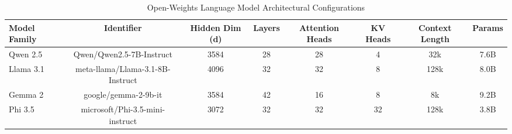 \begin{table}
\caption{Open-Weights Language Model Architectural Configurations}
\label{tab:models}
\begin{tabular}{lccccccc}
\toprule
Model Family & Identifier & Hidden Dim (d) & Layers & Attention Heads & KV Heads & Context Length & Params \\
\midrule
Qwen 2.5 & Qwen/Qwen2.5-7B-Instruct & 3584 & 28 & 28 & 4 & 32k & 7.6B \\
Llama 3.1 & meta-llama/Llama-3.1-8B-Instruct & 4096 & 32 & 32 & 8 & 128k & 8.0B \\
Gemma 2 & google/gemma-2-9b-it & 3584 & 42 & 16 & 8 & 8k & 9.2B \\
Phi 3.5 & microsoft/Phi-3.5-mini-instruct & 3072 & 32 & 32 & 32 & 128k & 3.8B \\
\bottomrule
\end{tabular}
\end{table}
